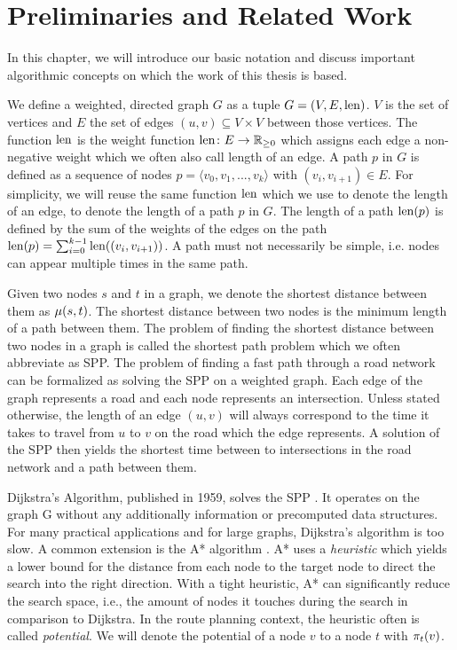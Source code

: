 
\chapter{Preliminaries and Related Work}
\label{ch:preliminaries}
In this chapter, we will introduce our basic notation and discuss important algorithmic concepts on which the work of this thesis is based.

We define a weighted, directed graph $G$ as a tuple $G=(V,E,\operatorname{len})$. $V$ is the set of vertices and $E$ the set of edges $(u,v) \subseteq V \times V$ between those vertices. The function $\operatorname{len}$ is the weight function $\operatorname{len}\colon E \rightarrow \mathbb{R}_{\ge 0}$ which assigns each edge a non-negative weight which we often also call length of an edge. A path $p$ in $G$ is defined as a sequence of nodes $p = \langle v_0,v_1,...,v_k \rangle$ with $(v_i,v_{i+1}) \in E$. For simplicity, we will reuse the same function $\operatorname{len}$ which we use to denote the length of an edge, to denote the length of a path $p$ in $G$. The length of a path $\operatorname{len}(p)$ is defined by the sum of the weights of the edges on the path $\operatorname{len}(p) = \sum_{i=0}^{k-1}{\operatorname{len}((v_i,v_{i+1}))}$. A path must not necessarily be simple, i.e. nodes can appear multiple times in the same path.

Given two nodes $s$ and $t$ in a graph, we denote the shortest distance between them as $\mu(s,t)$. The shortest distance between two nodes is the minimum length of a path between them. The problem of finding the shortest distance between two nodes in a graph is called the shortest path problem which we often abbreviate as SPP. The problem of finding a fast path through a road network can be formalized as solving the SPP on a weighted graph. Each edge of the graph represents a road and each node represents an intersection. Unless stated otherwise, the length  of an edge $(u,v)$ will always correspond to the time it takes to travel from $u$ to $v$ on the road which the edge represents. A solution of the SPP then yields the shortest time between to intersections in the road network and a path between them.

Dijkstra's Algorithm, published in 1959, solves the SPP \cite{dijkstra:1959}. It operates on the graph G without any additionally information or precomputed data structures. For many practical applications and for large graphs, Dijkstra's algorithm is too slow. A common extension is the A* algorithm \cite{hart:1968}. A* uses a \emph{heuristic} which yields a lower bound for the distance from each node to the target node to direct the search into the right direction. With a tight heuristic, A* can significantly reduce the search space, i.e., the amount of nodes it touches during the search in comparison to Dijkstra. In the route planning context, the heuristic often is called \emph{potential}. We will denote the potential of a node $v$ to a node $t$ with $\pi_t(v)$.

